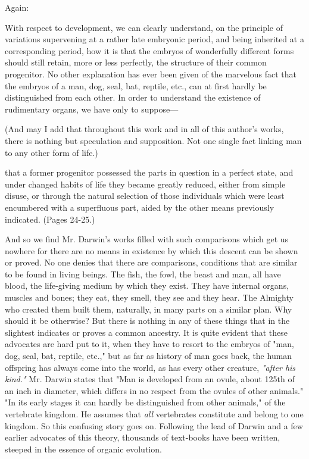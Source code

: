 Again:

With respect to development, we can clearly understand, on the principle of variations
supervening at a rather late embryonic period, and being inherited at a corresponding period,
how it is that the embryos of wonderfully different forms should still retain, more or less
perfectly, the structure of their common progenitor. No other explanation has ever been given
of the marvelous fact that the embryos of a man, dog, seal, bat, reptile, etc., can at first hardly
be distinguished from each other. In order to understand the existence of rudimentary organs,
we have only to suppose—

(And may I add that throughout this work and in all of this author's works, there is nothing
but speculation and supposition. Not one single fact linking man to any other form of life.)

that a former progenitor possessed the parts in question in a perfect state, and under changed
habits of life they became greatly reduced, either from simple disuse, or through the natural
selection of those individuals which were least encumbered with a superfluous part, aided by
the other means previously indicated. (Pages 24-25.)

And so we find Mr. Darwin's works filled with such comparisons which get us nowhere for
there are no means in existence by which this descent can be shown or proved. No one denies
that there are comparisons, conditions that are similar to be found in living beings. The fish,
the fowl, the beast and man, all have blood, the life-giving medium by which they exist. They
have internal organs, muscles and bones; they eat, they smell, they see and they hear. The
Almighty who created them built them, naturally, in many parts on a similar plan. Why
should it be otherwise? But there is nothing in any of these things that in the slightest
indicates or proves a common ancestry. It is quite evident that these advocates are hard put to
it, when they have to resort to the embryos of "man, dog, seal, bat, reptile, etc.," but as far as
history of man goes back, the human offspring has always come into the world, as has every
other creature, \textit{"after his kind."} Mr. Darwin states that "Man is developed from an ovule,
about 125th of an inch in diameter, which differs in no respect from the ovules of other
animals." "In its early stages it can hardly be distinguished from other animals," of the
vertebrate kingdom. He assumes that \textit{all} vertebrates constitute and belong to one kingdom.
So this confusing story goes on. Following the lead of Darwin and a few earlier advocates of
this theory, thousands of text-books have been written, steeped in the essence of organic
evolution.

